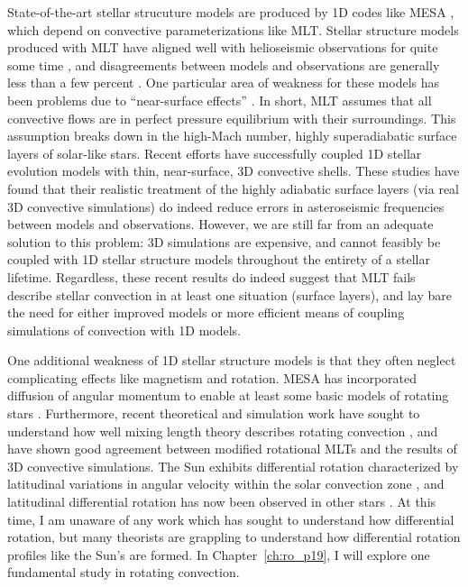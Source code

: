 State-of-the-art stellar strucuture models are produced by 1D codes like MESA \citep{paxton&all2011}, which depend on convective parameterizations like MLT.
Stellar structure models produced with MLT have aligned well with helioseismic observations for quite some time \citep{christensen-dalsgaard&all1996}, and disagreements between models and observations are generally less than a few percent \citep{serenelli&all2009}.
One particular area of weakness for these models has been problems due to ``near-surface effects'' \citep{kjeldsen&all2008}.
In short, MLT assumes that all convective flows are in perfect pressure equilibrium with their surroundings.
This assumption breaks down in the high-Mach number, highly superadiabatic surface layers of solar-like stars.
Recent efforts \citep{jorgensen&weiss2019, mosumgaard&all2020} have successfully coupled 1D stellar evolution models with thin, near-surface, 3D convective shells.
These studies have found that their realistic treatment of the highly adiabatic surface layers (via real 3D convective simulations) do indeed reduce errors in asteroseismic frequencies between models and observations.
However, we are still far from an adequate solution to this problem: 3D simulations are expensive, and cannot feasibly be coupled with 1D stellar structure models throughout the entirety of a stellar lifetime.
Regardless, these recent results do indeed suggest that MLT fails describe stellar convection in at least one situation (surface layers), and lay bare the need for either improved models or more efficient means of coupling simulations of convection with 1D models.

One additional weakness of 1D stellar structure models is that they often neglect complicating effects like magnetism and rotation.
MESA has incorporated diffusion of angular momentum to enable at least some basic models of rotating stars \citep{paxton&all2013}.
Furthermore, recent theoretical and simulation work have sought to understand how well mixing length theory describes rotating convection \citep{BDLithwick2014, currie&all2020}, and have shown good agreement between modified rotational MLTs and the results of 3D convective simulations.
The Sun exhibits differential rotation characterized by latitudinal variations in angular velocity within the solar convection zone \citep{thompson&all1996, schou&all1998}, and latitudinal differential rotation has now been observed in other stars \citep{benomar&all2018}.
At this time, I am unaware of any work which has sought to understand how differential rotation, but many theorists \citep[e.g.,][]{brun&all2017} are grappling to understand how differential rotation profiles like the Sun's are formed.
In Chapter~\ref{ch:ro_p19}, I will explore one fundamental study in rotating convection.

